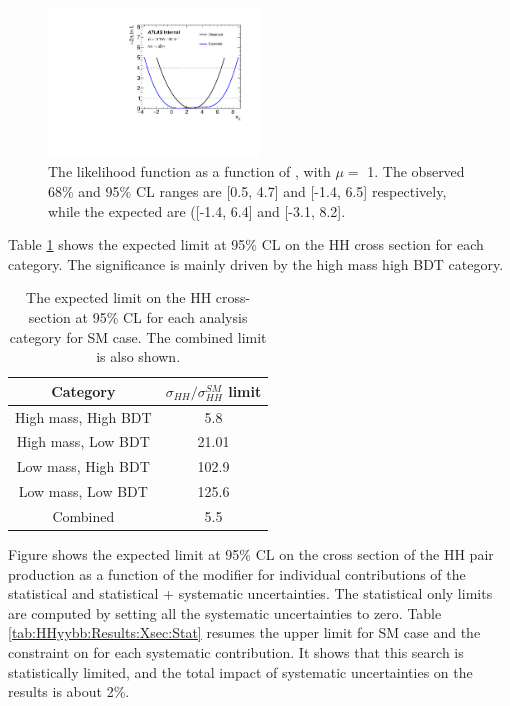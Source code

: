 \begin{figure}[htbp]
    \centering
    \includegraphics[width=0.5\textwidth]{Ch5/Img/figures_Results_scan_hhyybb_kl.pdf}
    \caption{The likelihood function as a function of \kl, with $\mu = $  1. The observed 68\% and 95\% CL ranges are [0.5, 4.7] and [-1.4, 6.5] respectively, while the expected are ([-1.4, 6.4] and [-3.1, 8.2].}
    \label{fig:HHyybb:Results:Xsec:LH}
\end{figure}

Table \ref{tab:HHyybb:Results:Xsec:Cat} shows the expected limit at 95\% CL on the HH cross section for each category. The significance is mainly driven by the high mass high BDT category. 

\begin{table}[htbp]
    \centering
    \begin{tabular}{cc}
        \hline\hline
        Category &  $\sigma_{HH}/\sigma_{HH}^{SM}$ limit \\
        \hline
        High mass, High BDT &  5.8 \\
        High mass, Low BDT &  21.01  \\
        Low mass, High BDT &  102.9 \\
        Low mass, Low BDT  &  125.6 \\
        \hline 
        Combined & 5.5 \\
        \hline\hline
    \end{tabular}
    \begin{tcolorbox}[colback=black!5!white,colframe=white!75!black]
    \caption{The expected limit on the HH cross-section at 95\% CL for each analysis category for SM case. The combined limit is also shown.}
    \label{tab:HHyybb:Results:Xsec:Cat}
    \end{tcolorbox}
\end{table}

Figure shows the expected limit at 95\% CL on the cross section of the HH pair production as a function of the \kl modifier for individual contributions of the statistical and statistical + systematic uncertainties. The statistical only limits are computed by setting all the systematic uncertainties to zero. Table \ref{tab:HHyybb:Results:Xsec:Stat} resumes the upper limit for SM  case and the constraint on \kl for each systematic contribution. It shows that this search is statistically limited, and the total impact of systematic uncertainties on the results is about 2\%.

